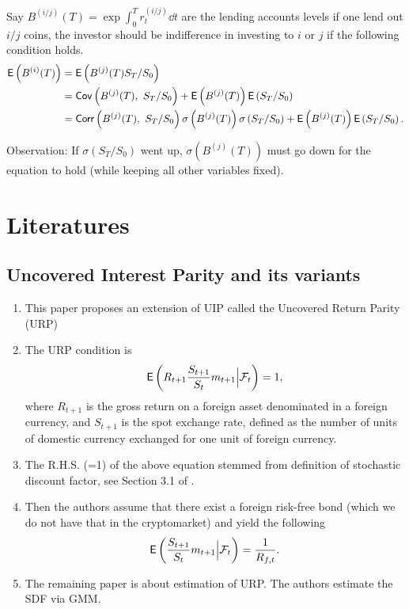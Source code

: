 \documentclass[square]{article} %
\theoremstyle{plain}
\theoremstyle{definition} %
\begin{document}
Say $B^{(i/j)}(T) = \exp\int_0^T r^{(i/j)}_t \dd t$ are the lending accounts levels if one lend out $i/j$ coins, 
 the investor should be indifference in investing to $i$ or $j$ if the following condition holds.
 \begin{align*}
  \mathbb{\sf E}\left(B^{(i)}(T)\right) 
  &= \mathbb{\sf E}\left(B^{(j)}(T)S_T/S_0\right)\\
  &= \mathbb{\sf Cov}\left(B^{(j)}(T),\ S_T/S_0\right) + \mathbb{\sf E}\left(B^{(j)}(T)\right)\mathbb{\sf E}\left(S_T/S_0\right)\\
  &= \mathbb{\sf Corr}\left(B^{(j)}(T),\ S_T/S_0\right) \sigma\left(B^{(j)}(T)\right) \sigma\left(S_T/S_0\right) + \mathbb{\sf E}\left(B^{(j)}(T)\right)\mathbb{\sf E}\left(S_T/S_0\right).
\end{align*}

Observation: If $\sigma\left(S_T/S_0\right)$ went up, $\sigma\left(B^{(j)}(T)\right)$ must go down for the equation to hold (while keeping all other variables fixed).

\section{Literatures}
\subsection{Uncovered Interest Parity and its variants}
\cite{cappiello2007uncovered}
\begin{enumerate}
  \item This paper proposes an extension of UIP called the Uncovered Return Parity (URP)
  \item The URP condition is 
  \begin{align*}
    \mathbb{\sf E}\left(R_{t+1}\frac{S_{t+1}}{S_t}m_{t+1}\Big|\mathcal{F}_t\right)=1,
  \end{align*}
  where $R_{t+1}$ is the gross return on a foreign asset denominated in a foreign currency, and $S_{t+1}$ is the spot exchange rate, defined as the number of units of domestic currency exchanged for one unit of foreign currency. 
  \item The R.H.S. (=1) of the above equation stemmed from definition of stochastic discount factor, see Section 3.1 of \cite{back2010asset}. 
  \item Then the authors assume that there exist a foreign risk-free bond (which we do not have that in the cryptomarket) and yield the following
  \begin{align*}
    \mathbb{\sf E}\left(\frac{S_{t+1}}{S_t}m_{t+1}\Big|\mathcal{F}_t\right) = \frac{1}{R_{f,t}}.
  \end{align*}
  \item The remaining paper is about estimation of URP. The authors estimate the SDF via GMM. 
\end{enumerate}
\end{document}
